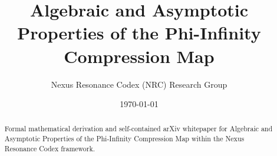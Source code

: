 \documentclass[11pt,a4paper]{article}
\title{Algebraic and Asymptotic Properties of the Phi-Infinity Compression Map}
\author{Nexus Resonance Codex (NRC) Research Group}
\date{\today}
\begin{document}
\maketitle

\begin{abstract}
Formal mathematical derivation and self-contained arXiv whitepaper for Algebraic and Asymptotic Properties of the Phi-Infinity Compression Map within the Nexus Resonance Codex framework.
\end{abstract}





\end{document}
